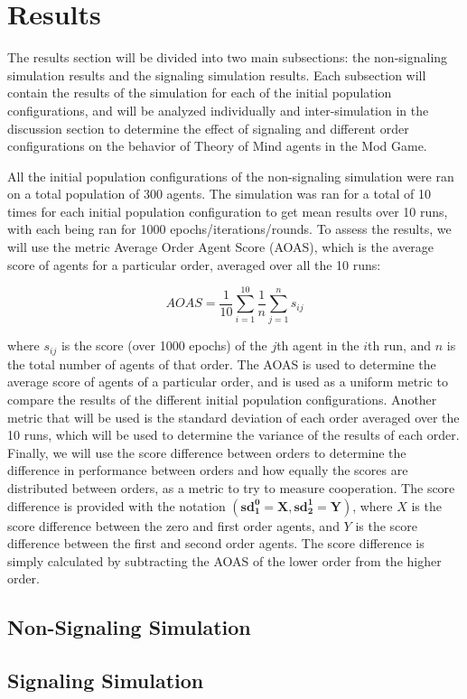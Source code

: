 \section{Results}\label{sec:results}

The results section will be divided into two main subsections: the non-signaling simulation results and the signaling simulation results. Each subsection will contain the results of the simulation for each of the initial population configurations, and will be analyzed individually and inter-simulation in the discussion section to determine the effect of signaling and different order configurations on the behavior of Theory of Mind agents in the Mod Game.

All the initial population configurations of the non-signaling simulation were ran on a total population of 300 agents. The simulation was ran for a total of 10 times for each initial population configuration to get mean results over 10 runs, with each being ran for 1000 epochs/iterations/rounds. To assess the results, we will use the metric Average Order Agent Score (AOAS), which is the average score of agents for a particular order, averaged over all the 10 runs: 

\begin{equation}
AOAS = \frac{1}{10} \sum_{i=1}^{10} \frac{1}{n} \sum_{j=1}^{n} s_{ij}
\label{eq:aoas}
\end{equation}

where $s_{ij}$ is the score (over 1000 epochs) of the $j$th agent in the $i$th run, and $n$ is the total number of agents of that order. The AOAS is used to determine the average score of agents of a particular order, and is used as a uniform metric to compare the results of the different initial population configurations. Another metric that will be used is the standard deviation of each order averaged over the 10 runs, which will be used to determine the variance of the results of each order. Finally, we will use the score difference between orders to determine the difference in performance between orders and how equally the scores are distributed between orders, as a metric to try to measure cooperation. The score difference is provided with the notation $(\mathbf{sd^0_1 = X}, \mathbf{sd^1_2 = Y})$, where $X$ is the score difference between the zero and first order agents, and $Y$ is the score difference between the first and second order agents. The score difference is simply calculated by subtracting the AOAS of the lower order from the higher order. 

\subsection{Non-Signaling Simulation}



\subsection{Signaling Simulation}

